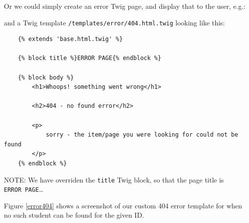 \documentclass[a4paperpaper,openright]{book}
\newenvironment{Shaded}{}{}
\newcommand{\KeywordTok}[1]{\textcolor[rgb]{0.00,0.44,0.13}{\textbf{#1}}}
\newcommand{\NormalTok}[1]{#1}
\newcommand{\OtherTok}[1]{\textcolor[rgb]{0.00,0.44,0.13}{#1}}
\newcommand{\StringTok}[1]{\textcolor[rgb]{0.25,0.44,0.63}{#1}}
\begin{document}
Or we could simply create an error Twig page, and display that to the
user, e.g.:

\begin{Shaded}
\end{Shaded}

and a Twig template \texttt{/templates/error/404.html.twig} looking like
this:

\begin{verbatim}
    {% extends 'base.html.twig' %}
    
    {% block title %}ERROR PAGE{% endblock %}

    {% block body %}
        <h1>Whoops! something went wrong</h1>

        <h2>404 - no found error</h2>

        <p>
            sorry - the item/page you were looking for could not be found
        </p>
    {% endblock %}
\end{verbatim}

NOTE: We have overriden the \texttt{title} Twig block, so that the page
title is \texttt{ERROR\ PAGE}\ldots{}

Figure \ref{error404} shows a screenshot of our custom 404 error
template for when no such student can be found for the given ID.
\end{document}

